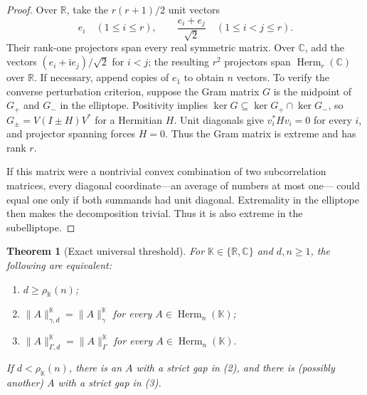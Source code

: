 \documentclass[11pt]{article}
\newtheorem{theorem}{Theorem}
\newcommand{\R}{\mathbb R}
\newcommand{\C}{\mathbb C}
\newcommand{\Herm}{\operatorname{Herm}}
\begin{document}
\begin{proof}
Over $\R$, take the $r(r+1)/2$ unit vectors
\[
 e_i\quad(1\le i\le r),\qquad
 \frac{e_i+e_j}{\sqrt2}\quad(1\le i<j\le r).
\]
Their rank-one projectors span every real symmetric matrix.  Over $\C$, add
the vectors $(e_i+\mathrm i e_j)/\sqrt2$ for $i<j$; the resulting $r^2$
projectors span $\Herm_r(\C)$ over $\R$.  If necessary, append copies of
$e_1$ to obtain $n$ vectors.  To verify the converse perturbation criterion,
suppose the Gram matrix $G$ is the midpoint of $G_+$ and $G_-$ in the
elliptope.  Positivity implies $\ker G\subseteq\ker G_+\cap\ker G_-$, so
$G_\pm=V(I\pm H)V^*$ for a Hermitian $H$.  Unit diagonals give
$v_i^*Hv_i=0$ for every $i$, and projector spanning forces $H=0$.  Thus the
Gram matrix is extreme and has rank $r$.

If this matrix were a nontrivial convex combination of two subcorrelation
matrices, every diagonal coordinate---an average of numbers at most one---
could equal one only if both summands had unit diagonal.  Extremality in the
elliptope then makes the decomposition trivial.  Thus it is also extreme in
the subelliptope.
\end{proof}

\begin{theorem}[Exact universal threshold]
For $\mathbb K\in\{\R,\C\}$ and $d,n\ge1$, the following are equivalent:
\begin{enumerate}
\item $d\ge\rho_{\mathbb K}(n)$;
\item $\|A\|_{\gamma,d}^{\mathbb K}=\|A\|_{\gamma}^{\mathbb K}$ for every
      $A\in\Herm_n(\mathbb K)$;
\item $\|A\|_{\Gamma,d}^{\mathbb K}=\|A\|_{\Gamma}^{\mathbb K}$ for every
      $A\in\Herm_n(\mathbb K)$.
\end{enumerate}
If $d<\rho_{\mathbb K}(n)$, there is an $A$ with a strict gap in (2), and
there is (possibly another) $A$ with a strict gap in (3).
\end{theorem}
\end{document}
